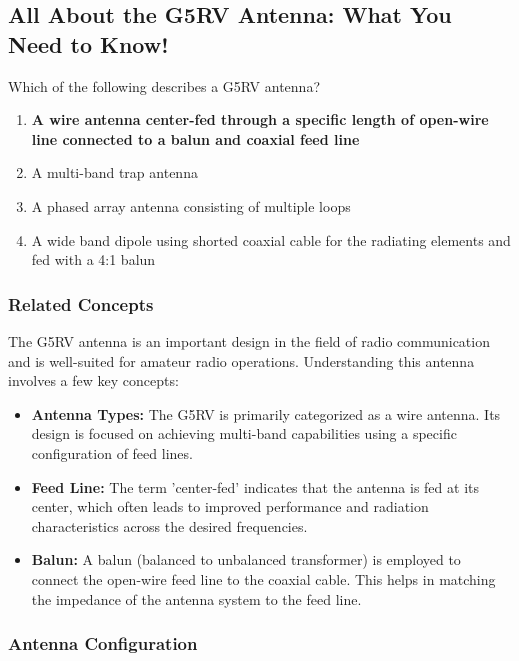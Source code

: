 \subsection{All About the G5RV Antenna: What You Need to Know!}

Which of the following describes a G5RV antenna?
\begin{tcolorbox}[colback=gray!10, colframe=black, title=E9C09]
\begin{enumerate}[label=\Alph*.]
    \item \textbf{A wire antenna center-fed through a specific length of open-wire line connected to a balun and coaxial feed line}
    \item A multi-band trap antenna
    \item A phased array antenna consisting of multiple loops
    \item A wide band dipole using shorted coaxial cable for the radiating elements and fed with a 4:1 balun
\end{enumerate} \end{tcolorbox}

\subsubsection*{Related Concepts}

The G5RV antenna is an important design in the field of radio communication and is well-suited for amateur radio operations. Understanding this antenna involves a few key concepts:

\begin{itemize}
    \item \textbf{Antenna Types:} The G5RV is primarily categorized as a wire antenna. Its design is focused on achieving multi-band capabilities using a specific configuration of feed lines.
    \item \textbf{Feed Line:} The term 'center-fed' indicates that the antenna is fed at its center, which often leads to improved performance and radiation characteristics across the desired frequencies.
    \item \textbf{Balun:} A balun (balanced to unbalanced transformer) is employed to connect the open-wire feed line to the coaxial cable. This helps in matching the impedance of the antenna system to the feed line.
\end{itemize}

\subsubsection*{Antenna Configuration}

